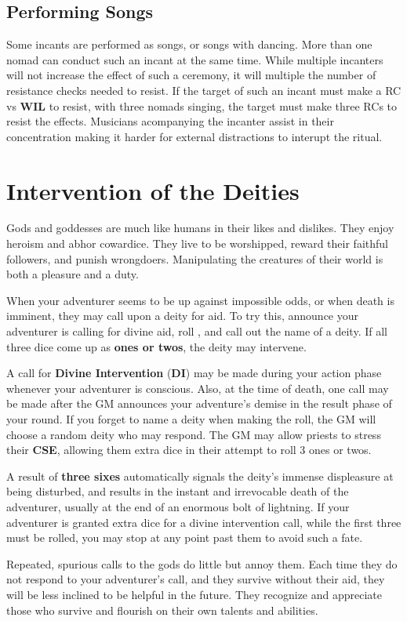 \begin{multicols*}{2}
\subsection{Performing Songs}
Some incants are performed as songs, or songs with dancing. More than one nomad can conduct such an incant at the same time. While multiple incanters will not increase the effect of such a ceremony, it will multiple the number of resistance checks needed to resist. If the target of such an incant must make a  RC vs \textbf{WIL} to resist, with three nomads singing, the target must make three RCs to resist the effects. Musicians acompanying the incanter assist in their concentration making it harder for external distractions to interupt the ritual.
\section{Intervention of the Deities}
Gods and goddesses are much like humans in their likes and dislikes. They enjoy heroism and abhor cowardice. They live to be worshipped, reward their faithful followers,
and punish wrongdoers. Manipulating the creatures of their world is both a pleasure and a duty.

When your adventurer seems to be up against impossible odds, or when death is imminent, they may call upon a deity for aid. To try this, announce your adventurer is calling for divine aid, roll , and call out the name of a deity. If all three dice come up as \textbf{ones or twos}, the deity may intervene.

A call for \textbf{Divine Intervention} (\textbf{DI}) may be made
during your action phase whenever your adventurer is conscious. Also, at the time of death, one call may be made after the GM announces your adventure’s demise in the result phase of your round. If you forget to name a deity when making the roll, the GM will choose a random deity who may respond. The GM may allow priests to stress their \textbf{CSE}, allowing them extra dice in their attempt to roll 3 ones or twos.

A result of \textbf{three sixes} automatically signals the deity’s immense displeasure at being disturbed, and results in the instant and irrevocable death of the adventurer, usually at the end of an enormous bolt of lightning. If your adventurer is granted extra dice for a divine intervention call, while the first three must be rolled, you may stop at any point past them to avoid such a fate.

Repeated, spurious calls to the gods do little but annoy them. Each time they do not respond to your adventurer’s call, and they survive without their aid, they will be less inclined to be helpful in the future. They recognize and appreciate those who survive and flourish on their own talents and abilities.

\end{multicols*}
